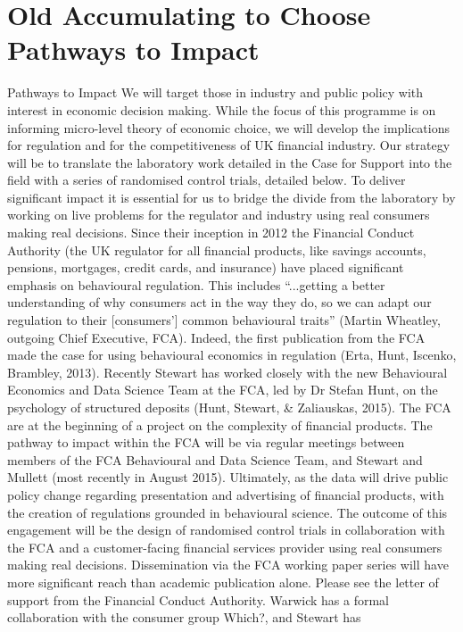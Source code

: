 
\section{Old Accumulating to Choose Pathways to Impact}

Pathways to Impact
We will target those in industry and public policy with interest in economic decision making.
While the focus of this programme is on informing micro-level theory of economic choice,
we will develop the implications for regulation and for the competitiveness of UK financial
industry. Our strategy will be to translate the laboratory work detailed in the Case for Support
into the field with a series of randomised control trials, detailed below. To deliver significant
impact it is essential for us to bridge the divide from the laboratory by working on live
problems for the regulator and industry using real consumers making real decisions.
Since their inception in 2012 the Financial Conduct Authority (the UK regulator for all
financial products, like savings accounts, pensions, mortgages, credit cards, and insurance)
have placed significant emphasis on behavioural regulation. This includes “...getting a better
understanding of why consumers act in the way they do, so we can adapt our regulation to
their [consumers’] common behavioural traits” (Martin Wheatley, outgoing Chief Executive,
FCA). Indeed, the first publication from the FCA made the case for using behavioural
economics in regulation (Erta, Hunt, Iscenko, Brambley, 2013). Recently Stewart has worked
closely with the new Behavioural Economics and Data Science Team at the FCA, led by Dr
Stefan Hunt, on the psychology of structured deposits (Hunt, Stewart, \& Zaliauskas, 2015).
The FCA are at the beginning of a project on the complexity of financial products. The
pathway to impact within the FCA will be via regular meetings between members of the FCA
Behavioural and Data Science Team, and Stewart and Mullett (most recently in August 2015).
Ultimately, as the data will drive public policy change regarding presentation and advertising
of financial products, with the creation of regulations grounded in behavioural science. The
outcome of this engagement will be the design of randomised control trials in collaboration
with the FCA and a customer-facing financial services provider using real consumers making
real decisions. Dissemination via the FCA working paper series will have more significant
reach than academic publication alone. Please see the letter of support from the Financial
Conduct Authority.
Warwick has a formal collaboration with the consumer group Which?, and Stewart has
